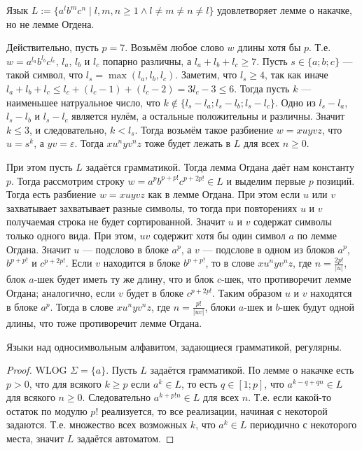 \documentclass[12pt,a4paper]{article}
\begin{document}
    \begin{example}
        Язык $L := \{a^l b^m c^n \mid l, m, n \geqslant 1 \wedge l \neq m \neq n \neq l\}$ удовлетворяет лемме о накачке, но не лемме Огдена.

        Действительно, пусть $p = 7$. Возьмём любое слово $w$ длины хотя бы $p$. Т.е. $w = a^{l_a} b^{l_b} c^{l_c}$, $l_a$, $l_b$ и $l_c$ попарно различны, а $l_a + l_b + l_c \geqslant 7$. Пусть $s \in \{a; b; c\}$ --- такой символ, что $l_s = \max(l_a, l_b, l_c)$. Заметим, что $l_s \geqslant 4$, так как иначе $l_a + l_b + l_c \leqslant l_c + (l_c - 1) + (l_c - 2) = 3l_c - 3 \leqslant 6$. Тогда пусть $k$ --- наименьшее натруальное число, что $k \notin \{l_s - l_a; l_s - l_b; l_s - l_c\}$. Одно из $l_s - l_a$, $l_s - l_b$ и $l_s - l_c$ является нулём, а остальные положительны и различны. Значит $k \leqslant 3$, и следовательно, $k < l_s$. Тогда возьмём такое разбиение $w = xuyvz$, что $u = s^k$, а $yv = \varepsilon$. Тогда $x u^n y v^n z$ тоже будет лежать в $L$ для всех $n \geqslant 0$.

        При этом пусть $L$ задаётся грамматикой. Тогда лемма Огдана даёт нам константу $p$. Тогда рассмотрим строку $w = a^p b^{p + p!} c^{p + 2p!} \in L$ и выделим первые $p$ позиций. Тогда есть разбиение $w = xuyvz$ как в лемме Огдана. При этом если $u$ или $v$ захватывает захватывает разные символы, то тогда при повторениях $u$ и $v$ получаемая строка не будет сортированной. Значит $u$ и $v$ содержат символы только одного вида. При этом, $uv$ содержит хотя бы один символ $a$ по лемме Огдана. Значит $u$ --- подслово в блоке $a^p$, а $v$ --- подслове в одном из блоков $a^p$, $b^{p + p!}$ и $c^{p + 2p!}$. Если $v$ находится в блоке $b^{p + p!}$, то в слове $x u^n y v^n z$, где $n = \frac{2p!}{|u|}$, блок $a$-шек будет иметь ту же длину, что и блок $c$-шек, что противоречит лемме Огдана; аналогично, если $v$ будет в блоке $c^{p + 2p!}$. Таким образом $u$ и $v$ находятся в блоке $a^p$. Тогда в слове $x u^n y v^n z$, где $n = \frac{p!}{|uv|}$, блоки $a$-шек и $b$-шек будут одной длины, что тоже противоречит лемме Огдана.
    \end{example}

    \begin{theorem}
        Языки над односимвольным алфавитом, задающиеся грамматикой, регулярны.
    \end{theorem}

    \begin{proof}
        WLOG $\Sigma = \{a\}$. Пусть $L$ задаётся грамматикой. По лемме о накачке есть $p > 0$, что для всякого $k \geqslant p$ если $a^k \in L$, то есть $q \in [1; p]$, что $a^{k - q + qn} \in L$ для всякого $n \geqslant 0$. Следовательно $a^{k + p! n} \in L$ для всех $n$. Т.е. если какой-то остаток по модулю $p!$ реализуется, то все реализации, начиная с некоторой задаются. Т.е. множество всех возможных $k$, что $a^k \in L$ периодично с некоторого места, значит $L$ задаётся автоматом.
    \end{proof}
\end{document}
